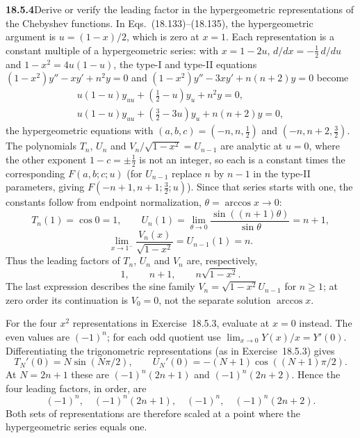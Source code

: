 \par\bigskip
\noindent\textbf{18.5.4}\quad Derive or verify the leading factor in
the hypergeometric representations of the Chebyshev functions.
\solution
In Eqs.~(18.133)--(18.135), the hypergeometric argument is
$u=(1-x)/2$, which is zero at $x=1$.  Each representation is a
constant multiple of a hypergeometric series: with $x=1-2u$,
$d/dx=-\frac12\,d/du$ and $1-x^2=4u(1-u)$, the type-I and type-II
equations $(1-x^2)y''-xy'+n^2y=0$ and
$(1-x^2)y''-3xy'+n(n+2)y=0$ become
\begin{gather*}
u(1-u)y_{uu}+(\tfrac12-u)y_u+n^2y=0,\\
u(1-u)y_{uu}+(\tfrac32-3u)y_u+n(n+2)y=0,
\end{gather*}
the hypergeometric equations with $(a,b,c)=(-n,n,\frac12)$ and
$(-n,n+2,\frac32)$.  The polynomials $T_n$, $U_n$ and
$V_n/\sqrt{1-x^2}=U_{n-1}$ are analytic at $u=0$, where the other
exponent $1-c=\pm\frac12$ is not an integer, so each is a constant
times the corresponding $F(a,b;c;u)$ (for $U_{n-1}$ replace $n$ by
$n-1$ in the type-II parameters, giving $F(-n+1,n+1;\frac32;u)$).
Since that series starts with one, the constants follow from
endpoint normalization, $\theta=\arccos x\to0$:
\[
T_n(1)=\cos0=1,\qquad
U_n(1)=\lim_{\theta\to0}\frac{\sin((n+1)\theta)}{\sin\theta}=n+1,
\]
\[
\lim_{x\to1^-}\frac{V_n(x)}{\sqrt{1-x^2}}=U_{n-1}(1)=n.
\]
Thus the leading factors of $T_n$, $U_n$ and $V_n$ are, respectively,
\[
\boxed{1,\qquad n+1,\qquad n\sqrt{1-x^2}}.
\]
The last expression describes the sine family $V_n=\sqrt{1-x^2}U_{n-1}$
for $n\ge1$; at zero order its continuation is $V_0=0$, not the
separate solution $\arccos x$.

For the four $x^2$ representations in Exercise~18.5.3, evaluate
at $x=0$ instead.  The even values are $(-1)^n$; for each odd
quotient use $\lim_{x\to0}Y(x)/x=Y'(0)$.  Differentiating the
trigonometric representations (as in Exercise~18.5.3) gives
\[
T_N'(0)=N\sin(N\pi/2),\qquad
U_N'(0)=-(N+1)\cos((N+1)\pi/2).
\]
At $N=2n+1$ these are $(-1)^n(2n+1)$ and
$(-1)^n(2n+2)$.  Hence the four leading factors, in order, are
\[
\boxed{(-1)^n,\quad(-1)^n(2n+1),\quad(-1)^n,\quad(-1)^n(2n+2)}.
\]
Both sets of representations are therefore scaled at a point where
the hypergeometric series equals one.

